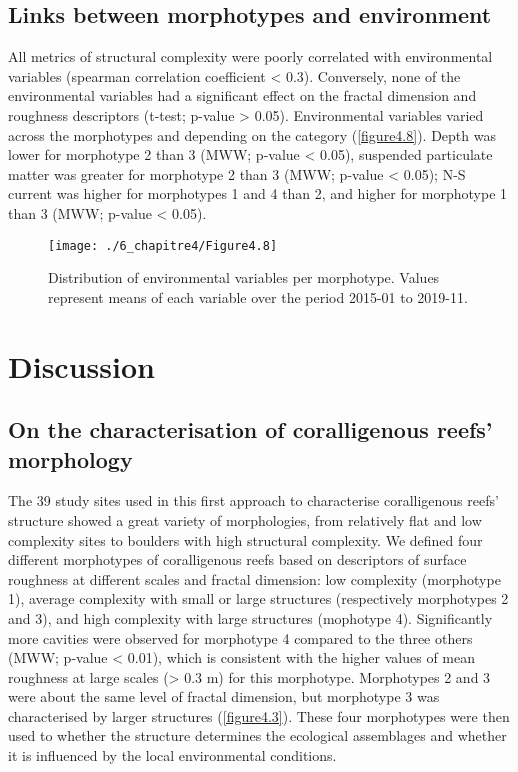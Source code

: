 \subsection{Links between morphotypes and environment}\label{chapitre4_3.3}
All metrics of structural complexity were poorly correlated with environmental variables (spearman correlation coefficient < 0.3). Conversely, none of the environmental variables had a significant effect on the fractal dimension and roughness descriptors (t-test; p-value > 0.05). Environmental variables varied across the morphotypes and depending on the category (\autoref{figure4.8}). Depth was lower for morphotype 2 than 3 (MWW; p-value < 0.05), suspended particulate matter was greater for morphotype 2 than 3 (MWW; p-value < 0.05); N-S current was higher for morphotypes 1 and 4 than 2, and higher for morphotype 1 than 3 (MWW; p-value < 0.05).

\begin{figure}[H]
	\begin{center}
	\texttt{[image: ./6\_chapitre4/Figure4.8]}
		\caption[Distribution of environmental variables per morphotype]{Distribution of environmental variables per morphotype. Values represent means of each variable over the period 2015-01 to 2019-11.}
	\label{figure4.8}
\end{center}
\end{figure}


\section{Discussion}\label{chapitre4_4}

\subsection{On the characterisation of coralligenous reefs’ morphology}\label{chapitre4_4.1}
The 39 study sites used in this first approach to characterise coralligenous reefs’ structure showed a great variety of morphologies, from relatively flat and low complexity sites to boulders with high structural complexity. We defined four different morphotypes of coralligenous reefs based on descriptors of surface roughness at different scales and fractal dimension: low complexity (morphotype 1), average complexity with small or large structures (respectively morphotypes 2 and 3), and high complexity with large structures (mophotype 4). Significantly more cavities were observed for morphotype 4 compared to the three others (MWW; p-value < 0.01), which is consistent with the higher values of mean roughness at large scales (> 0.3 m) for this morphotype. Morphotypes 2 and 3 were about the same level of fractal dimension, but morphotype 3 was characterised by larger structures (\autoref{figure4.3}). These four morphotypes were then used to whether the structure determines the ecological assemblages and whether it is influenced by the local environmental conditions.

